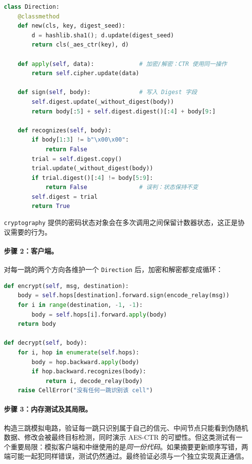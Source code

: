 \begin{lstlisting}[language=Python]
class Direction:
    @classmethod
    def new(cls, key, digest_seed):
        d = hashlib.sha1(); d.update(digest_seed)
        return cls(_aes_ctr(key), d)

    def apply(self, data):             # 加密/解密：CTR 使用同一操作
        return self.cipher.update(data)

    def sign(self, body):              # 写入 Digest 字段
        self.digest.update(_without_digest(body))
        return body[:5] + self.digest.digest()[:4] + body[9:]

    def recognizes(self, body):
        if body[1:3] != b"\x00\x00":
            return False
        trial = self.digest.copy()
        trial.update(_without_digest(body))
        if trial.digest()[:4] != body[5:9]:
            return False               # 误判：状态保持不变
        self.digest = trial
        return True
\end{lstlisting}

\texttt{cryptography} 提供的密码状态对象会在多次调用之间保留计数器状态，这正是协议需要的行为。

\paragraph{步骤 2：客户端。} 对每一跳的两个方向各维护一个 \texttt{Direction} 后，加密和解密都变成循环：

\begin{lstlisting}[language=Python]
def encrypt(self, msg, destination):
    body = self.hops[destination].forward.sign(encode_relay(msg))
    for i in range(destination, -1, -1):
        body = self.hops[i].forward.apply(body)
    return body

def decrypt(self, body):
    for i, hop in enumerate(self.hops):
        body = hop.backward.apply(body)
        if hop.backward.recognizes(body):
            return i, decode_relay(body)
    raise CellError("没有任何一跳识别该 cell")
\end{lstlisting}

\paragraph{步骤 3：内存测试及其局限。}  构造三跳模拟电路，验证每一跳只识别属于自己的信元、中间节点只能看到伪随机数据、修改会被最终目标检测，同时演示 AES-CTR 的可塑性。但这类测试有一个重要局限：模拟客户端和中继使用的是\emph{同一份代码}。如果摘要更新顺序写错，两端可能一起犯同样错误，测试仍然通过。最终验证必须与一个独立实现真正通信。

